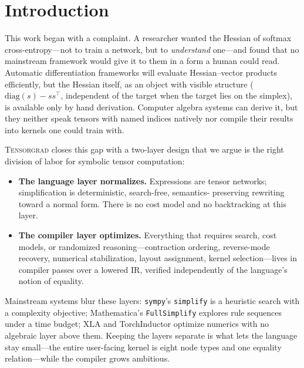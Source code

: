 \documentclass[sigplan,10pt,review]{acmart}
\begin{document}
\section{Introduction}\label{sec:intro}

This work began with a complaint. A researcher wanted the Hessian of
softmax cross-entropy---not to train a network, but to \emph{understand}
one---and found that no mainstream framework would give it to them in a
form a human could read. Automatic differentiation frameworks
\cite{jax,pytorch} will evaluate Hessian--vector products efficiently, but
the Hessian itself, as an object with visible structure
($\mathrm{diag}(s) - ss^{\top}$, independent of the target when the target
lies on the simplex), is available only by hand derivation. Computer
algebra systems \cite{mathematica,sympy} can derive it, but they neither
speak tensors with named indices natively nor compile their results into
kernels one could train with.

\textsc{Tensorgrad} closes this gap with a two-layer design that we argue
is the right division of labor for symbolic tensor computation:

\begin{itemize}
\item \textbf{The language layer normalizes.} Expressions are tensor
  networks; simplification is deterministic, search-free, semantics-%
  preserving rewriting toward a normal form. There is no cost model and no
  backtracking at this layer.
\item \textbf{The compiler layer optimizes.} Everything that requires
  search, cost models, or randomized reasoning---contraction ordering,
  reverse-mode recovery, numerical stabilization, layout assignment,
  kernel selection---lives in compiler passes over a lowered IR, verified
  independently of the language's notion of equality.
\end{itemize}

Mainstream systems blur these layers: \texttt{sympy}'s
\texttt{simplify} is a heuristic search with a complexity objective;
Mathematica's \texttt{FullSimplify} explores rule sequences under a time
budget; XLA \cite{xla} and TorchInductor \cite{pytorch2} optimize numerics with no algebraic layer
above them. Keeping the layers separate is what lets the language stay
small---the entire user-facing kernel is eight node types and one equality
relation---while the compiler grows ambitious.
\end{document}
